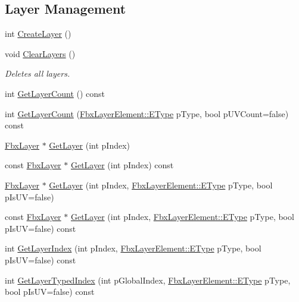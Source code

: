\subsection*{Layer Management}
\begin{DoxyCompactItemize}
\item 
int \hyperlink{class_fbx_layer_container_a6c94199b503304c310274f6d88919cea}{Create\+Layer} ()
\item 
void \hyperlink{class_fbx_layer_container_a6b0b68caee343bddb68d1d1bd57c360f}{Clear\+Layers} ()
\begin{DoxyCompactList}\small\item\em Deletes all layers. \end{DoxyCompactList}\item 
int \hyperlink{class_fbx_layer_container_a6e4b2f8db87dd358a088af464147156b}{Get\+Layer\+Count} () const
\item 
int \hyperlink{class_fbx_layer_container_abd468a447a9b2175391515a3d038ebce}{Get\+Layer\+Count} (\hyperlink{class_fbx_layer_element_a8c95c5cd880b56c776acd379bd86f42c}{Fbx\+Layer\+Element\+::\+E\+Type} p\+Type, bool p\+U\+V\+Count=false) const
\item 
\hyperlink{class_fbx_layer}{Fbx\+Layer} $\ast$ \hyperlink{class_fbx_layer_container_a84f58c0498e55ff9123bba6040cccb7a}{Get\+Layer} (int p\+Index)
\item 
const \hyperlink{class_fbx_layer}{Fbx\+Layer} $\ast$ \hyperlink{class_fbx_layer_container_a8c69bb442675cff3f1bc8f2be8511558}{Get\+Layer} (int p\+Index) const
\item 
\hyperlink{class_fbx_layer}{Fbx\+Layer} $\ast$ \hyperlink{class_fbx_layer_container_ae5335d608b3b4e6d44c9221b3c3d2d73}{Get\+Layer} (int p\+Index, \hyperlink{class_fbx_layer_element_a8c95c5cd880b56c776acd379bd86f42c}{Fbx\+Layer\+Element\+::\+E\+Type} p\+Type, bool p\+Is\+UV=false)
\item 
const \hyperlink{class_fbx_layer}{Fbx\+Layer} $\ast$ \hyperlink{class_fbx_layer_container_ac40b3916586310abe9a229308b9a01cd}{Get\+Layer} (int p\+Index, \hyperlink{class_fbx_layer_element_a8c95c5cd880b56c776acd379bd86f42c}{Fbx\+Layer\+Element\+::\+E\+Type} p\+Type, bool p\+Is\+UV=false) const
\item 
int \hyperlink{class_fbx_layer_container_aca34de2197e7fde76155d1e5dd5c6e77}{Get\+Layer\+Index} (int p\+Index, \hyperlink{class_fbx_layer_element_a8c95c5cd880b56c776acd379bd86f42c}{Fbx\+Layer\+Element\+::\+E\+Type} p\+Type, bool p\+Is\+UV=false) const
\item 
int \hyperlink{class_fbx_layer_container_af65cfa24a4de1035fd9ad461f4a343ce}{Get\+Layer\+Typed\+Index} (int p\+Global\+Index, \hyperlink{class_fbx_layer_element_a8c95c5cd880b56c776acd379bd86f42c}{Fbx\+Layer\+Element\+::\+E\+Type} p\+Type, bool p\+Is\+UV=false) const
\end{DoxyCompactItemize}
